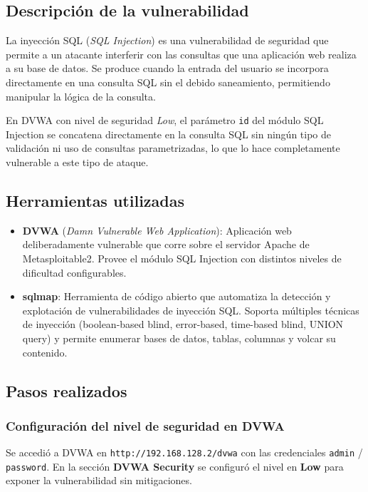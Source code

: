 \documentclass[12pt, letterpaper]{article}
\begin{document}
\subsection{Descripción de la vulnerabilidad}

La inyección SQL (\textit{SQL Injection}) es una vulnerabilidad de seguridad que permite a un atacante interferir con las consultas que una aplicación web realiza a su base de datos. Se produce cuando la entrada del usuario se incorpora directamente en una consulta SQL sin el debido saneamiento, permitiendo manipular la lógica de la consulta.

En DVWA con nivel de seguridad \textit{Low}, el parámetro \texttt{id} del módulo SQL Injection se concatena directamente en la consulta SQL sin ningún tipo de validación ni uso de consultas parametrizadas, lo que lo hace completamente vulnerable a este tipo de ataque.

\subsection{Herramientas utilizadas}

\begin{itemize}
  \item \textbf{DVWA} (\textit{Damn Vulnerable Web Application}): Aplicación web deliberadamente vulnerable que corre sobre el servidor Apache de Metasploitable2. Provee el módulo SQL Injection con distintos niveles de dificultad configurables.
  \item \textbf{sqlmap}: Herramienta de código abierto que automatiza la detección y explotación de vulnerabilidades de inyección SQL. Soporta múltiples técnicas de inyección (boolean-based blind, error-based, time-based blind, UNION query) y permite enumerar bases de datos, tablas, columnas y volcar su contenido.
\end{itemize}

\subsection{Pasos realizados}

\subsubsection{Configuración del nivel de seguridad en DVWA}

Se accedió a DVWA en \texttt{http://192.168.128.2/dvwa} con las credenciales \texttt{admin} / \texttt{password}. En la sección \textbf{DVWA Security} se configuró el nivel en \textbf{Low} para exponer la vulnerabilidad sin mitigaciones.
\end{document}
